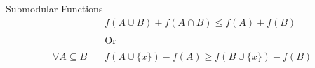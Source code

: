\begin{frame}{Submodular Functions}
\begin{align*}
    & f(A \cup B) + f(A \cap B) \leq f(A) + f(B)
    \\
    \\
    & \text{Or}
    \\
    \\
    \forall A \subseteq B \quad & f(A \cup \{x\}) - f(A) \geq f(B \cup \{x\}) - f(B)
    \\
\end{align*}
\end{frame}